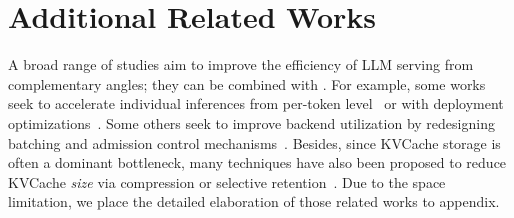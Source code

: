\section{Additional Related Works}
\label{sec:related}

A broad range of studies aim to improve the efficiency of LLM serving from complementary angles; they can be combined with \oursched.
For example, some works seek to accelerate individual inferences from per-token level~\cite{dao2022flashattention,dao2023flashattention,dettmers2022gpt3,frantar2022gptq,leviathan2023speculative,miao2023specinfer} or with deployment optimizations~\cite{zhong2024distserve,qin2024mooncake,hu2024memserve,hu2024inference,agrawal2024taming}.
Some others seek to improve backend utilization by redesigning batching and admission control mechanisms~\cite{duan2024muxserve,xiang2025aegaeon}.
Besides, since KVCache storage is often a dominant bottleneck, many techniques have also been proposed to reduce KVCache \emph{size} via compression or selective retention~\cite{xiao2023efficient,zhang2023h2o,lee2024infinigen}.
Due to the space limitation, we place the detailed elaboration of those related works to appendix.



